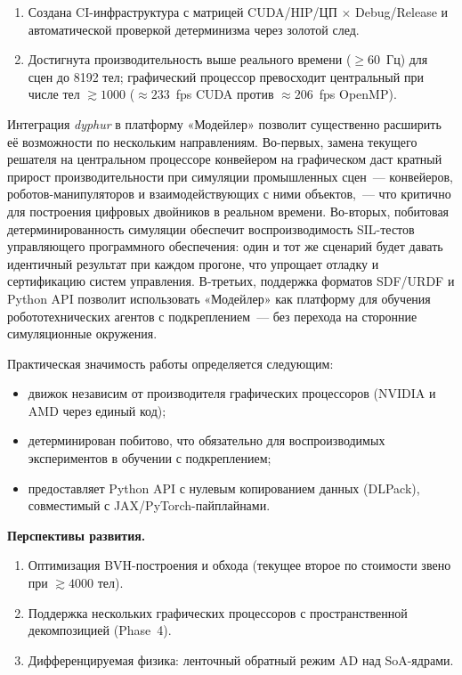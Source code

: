 \begin{enumerate}
  \item Создана CI-инфраструктура с матрицей CUDA/HIP/ЦП $\times$ Debug/Release
    и автоматической проверкой детерминизма через золотой след.

  \item Достигнута производительность выше реального времени
    ($\geq 60$~Гц) для сцен до 8192 тел;
    графический процессор превосходит центральный при числе тел $\gtrsim 1000$
    (${\approx}233$~fps CUDA против ${\approx}206$~fps OpenMP).
\end{enumerate}

Интеграция \textit{dyphur} в платформу «Модейлер» позволит существенно расширить её возможности по нескольким 
направлениям. Во-первых, замена текущего решателя на центральном процессоре конвейером на графическом даст кратный прирост производительности 
при симуляции промышленных сцен~--- конвейеров, роботов-манипуляторов и взаимодействующих с ними объектов,~--- 
что критично для построения цифровых двойников в реальном времени. Во-вторых, побитовая детерминированность 
симуляции обеспечит воспроизводимость SIL-тестов управляющего программного обеспечения: один и тот же сценарий 
будет давать идентичный результат при каждом прогоне, что упрощает отладку и сертификацию систем управления. 
В-третьих, поддержка форматов SDF/URDF и Python API позволит использовать «Модейлер» как платформу для 
обучения робототехнических агентов с подкреплением~--- без перехода на сторонние симуляционные окружения.

Практическая значимость работы определяется следующим:

\begin{itemize}
  \item движок независим от производителя графических процессоров (NVIDIA и AMD через единый код);
  \item детерминирован побитово, что обязательно для воспроизводимых
    экспериментов в обучении с подкреплением;
  \item предоставляет Python API с нулевым копированием данных (DLPack),
    совместимый с JAX/PyTorch-пайплайнами.
\end{itemize}

\textbf{Перспективы развития.}
\begin{enumerate}
  \item Оптимизация BVH-построения и обхода (текущее второе по стоимости звено
    при $\gtrsim 4000$ тел).
  \item Поддержка нескольких графических процессоров с пространственной декомпозицией (Phase~4).
  \item Дифференцируемая физика: ленточный обратный режим AD над SoA-ядрами.
\end{enumerate}
